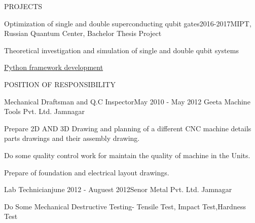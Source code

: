 \documentclass{resume} %
\begin{document}
\begin{rSection}{PROJECTS}


\begin{rSubsection}{Optimization of single and double superconducting qubit gates}{2016-2017}{MIPT, Russian Quantum Center, Bachelor Thesis Project}{}
\item Theoretical investigation and simulation of single and double qubit systems
\item \href{https://github.com/safoex/qubitlab}{Python framework development}
\end{rSubsection}



\end{rSection} 


\iffalse

\begin{rSection}{POSITION OF RESPONSIBILITY}

\begin{rSubsection}{Mechanical Draftsman and Q.C Inspector}{May 2010 - May 2012} {Geeta Machine Tools Pvt. Ltd. Jamnagar} {} 
\item Prepare 2D AND 3D Drawing and planning of a different CNC machine details
parts drawings and their assembly drawing.
\item Do some quality control work for maintain the quality of machine in the Units.
\item Prepare of foundation and electrical layout drawings.
\end{rSubsection}



\begin{rSubsection}{Lab Technician}{june 2012 - Auguest 2012}{Senor Metal Pvt. Ltd. Jamnagar} {}
 \item Do Some Mechanical Destructive Testing- Tensile Test, Impact Test,Hardness Test
\end{rSubsection}
 
\end{rSection}
\end{document}
